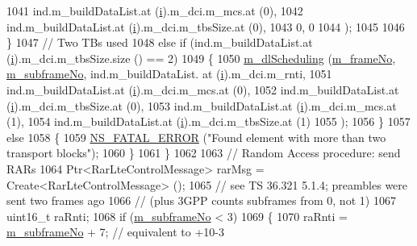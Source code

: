 \begin{DoxyCode}
1041                           ind.m\_buildDataList.at (\hyperlink{bernuolliDistribution_8m_a6f6ccfcf58b31cb6412107d9d5281426}{i}).m\_dci.m\_mcs.at (0),
1042                           ind.m\_buildDataList.at (\hyperlink{bernuolliDistribution_8m_a6f6ccfcf58b31cb6412107d9d5281426}{i}).m\_dci.m\_tbsSize.at (0),
1043                           0, 0
1044                           );
1045 
1046         \}
1047       \textcolor{comment}{// Two TBs used}
1048       \textcolor{keywordflow}{else} \textcolor{keywordflow}{if} (ind.m\_buildDataList.at (\hyperlink{bernuolliDistribution_8m_a6f6ccfcf58b31cb6412107d9d5281426}{i}).m\_dci.m\_tbsSize.size () == 2)
1049         \{
1050           \hyperlink{classns3_1_1LteEnbMac_a76fc41748a5422281aa4f3d2739512b5}{m\_dlScheduling} (\hyperlink{classns3_1_1LteEnbMac_a1ca20e5d0d321f28dc931bdcccadfada}{m\_frameNo}, \hyperlink{classns3_1_1LteEnbMac_adccfd57ac8aedd1182963517546fde38}{m\_subframeNo}, ind.m\_buildDataList.
      at (\hyperlink{bernuolliDistribution_8m_a6f6ccfcf58b31cb6412107d9d5281426}{i}).m\_dci.m\_rnti,
1051                           ind.m\_buildDataList.at (\hyperlink{bernuolliDistribution_8m_a6f6ccfcf58b31cb6412107d9d5281426}{i}).m\_dci.m\_mcs.at (0),
1052                           ind.m\_buildDataList.at (\hyperlink{bernuolliDistribution_8m_a6f6ccfcf58b31cb6412107d9d5281426}{i}).m\_dci.m\_tbsSize.at (0),
1053                           ind.m\_buildDataList.at (\hyperlink{bernuolliDistribution_8m_a6f6ccfcf58b31cb6412107d9d5281426}{i}).m\_dci.m\_mcs.at (1),
1054                           ind.m\_buildDataList.at (\hyperlink{bernuolliDistribution_8m_a6f6ccfcf58b31cb6412107d9d5281426}{i}).m\_dci.m\_tbsSize.at (1)
1055                           );
1056         \}
1057       \textcolor{keywordflow}{else}
1058         \{
1059           \hyperlink{group__fatal_ga5131d5e3f75d7d4cbfd706ac456fdc85}{NS\_FATAL\_ERROR} (\textcolor{stringliteral}{"Found element with more than two transport blocks"});
1060         \}
1061     \}
1062 
1063   \textcolor{comment}{// Random Access procedure: send RARs}
1064   Ptr<RarLteControlMessage> rarMsg = Create<RarLteControlMessage> ();
1065   \textcolor{comment}{// see TS 36.321 5.1.4;  preambles were sent two frames ago}
1066   \textcolor{comment}{// (plus 3GPP counts subframes from 0, not 1)}
1067   uint16\_t raRnti;
1068   \textcolor{keywordflow}{if} (\hyperlink{classns3_1_1LteEnbMac_adccfd57ac8aedd1182963517546fde38}{m\_subframeNo} < 3)
1069     \{
1070       raRnti = \hyperlink{classns3_1_1LteEnbMac_adccfd57ac8aedd1182963517546fde38}{m\_subframeNo} + 7; \textcolor{comment}{// equivalent to +10-3}

\end{DoxyCode}
